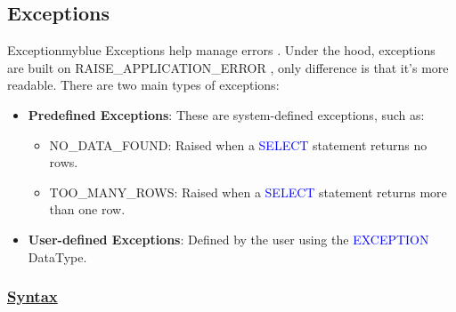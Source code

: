 \subsection{Exceptions}
\begin{prettyBox}{Exception}{myblue}
Exceptions help manage errors . Under
the hood, exceptions are built on RAISE\_APPLICATION\_ERROR ,  only difference is that it's more readable. There are two main types of exceptions:
\begin{itemize}
    \item \textbf{Predefined Exceptions}: These are system-defined exceptions, such as:
        \begin{itemize}
            \item NO\_DATA\_FOUND: Raised when a \textcolor{blue}{SELECT} statement returns no rows.
            \item TOO\_MANY\_ROWS: Raised when a \textcolor{blue}{SELECT} statement returns more than one row.
        \end{itemize}
    \item \textbf{User-defined Exceptions}: Defined by the user using the \textcolor{blue}{EXCEPTION} DataType.
\end{itemize}
\end{prettyBox}

\subsubsection*{\underline{Syntax}}







